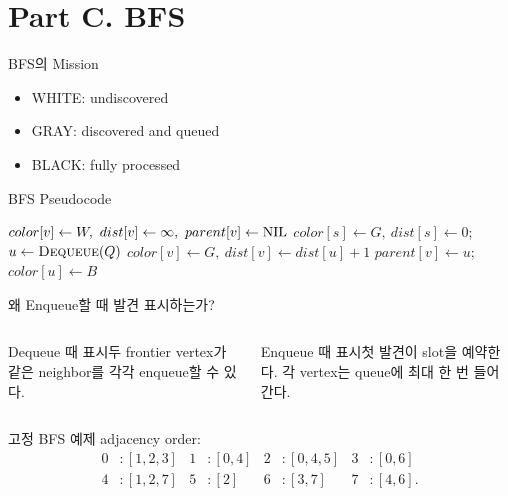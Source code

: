 \section{Part C. BFS}
\begin{frame}{BFS의 Mission}
\statelegend
\begin{itemize}\item WHITE: undiscovered\item GRAY: discovered and queued\item BLACK: fully processed\end{itemize}
\end{frame}
\begin{frame}{BFS Pseudocode}
\small
\begin{algorithmic}[1]
\State $color[v]\gets W,\ dist[v]\gets\infty,\ parent[v]\gets\NIL$\EndFor
\State $color[s]\gets G,\ dist[s]\gets0$; 
\State $u\gets\Call{Dequeue}{Q}$
\State $color[v]\gets G,\ dist[v]\gets dist[u]+1$
\State $parent[v]\gets u$; \EndIf\EndFor
\State $color[u]\gets B$\EndWhile\EndProcedure
\end{algorithmic}
\end{frame}
\begin{frame}{왜 Enqueue할 때 발견 표시하는가?}
\begin{columns}[T]\begin{alertblock}{Dequeue 때 표시}두 frontier vertex가 같은 neighbor를 각각 enqueue할 수 있다.\end{alertblock}
\begin{block}{Enqueue 때 표시}첫 발견이 slot을 예약한다. 각 vertex는 queue에 최대 한 번 들어간다.\end{block}\end{columns}
\end{frame}
\begin{frame}{고정 BFS 예제}
\small adjacency order:
\[
\begin{aligned}
0&:[1,2,3]&1&:[0,4]&2&:[0,4,5]&3&:[0,6]\\
4&:[1,2,7]&5&:[2]&6&:[3,7]&7&:[4,6].
\end{aligned}
\]
\centering{}
\end{frame}
